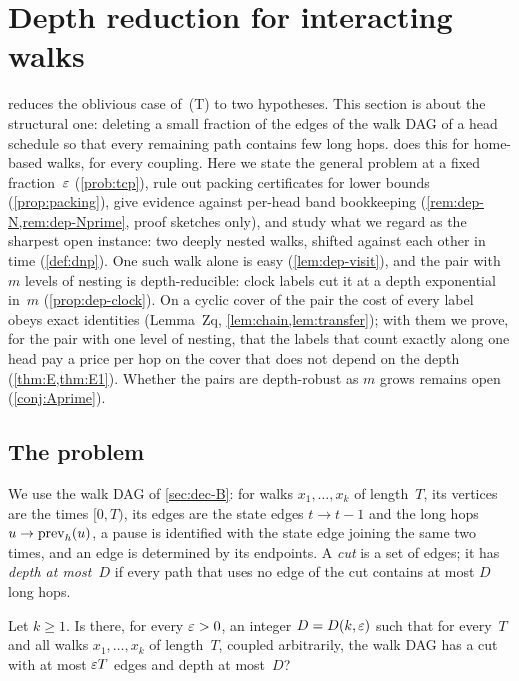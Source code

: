 \section{Depth reduction for interacting walks}\label{sec:depth}

 reduces the oblivious case of~(T) to two hypotheses. This section is about the structural one: deleting a
small fraction of the edges of the walk DAG of a head schedule so that every remaining path contains few long hops.
 does this for home-based walks, for every coupling. Here we state the general problem at a fixed
fraction~$\varepsilon$ (\cref{prob:tcp}), rule out packing certificates for lower bounds (\cref{prop:packing}), give
evidence against per-head band bookkeeping (\cref{rem:dep-N,rem:dep-Nprime}, proof sketches only), and study what we
regard as the sharpest open instance: two deeply nested walks, shifted against each other in time (\cref{def:dnp}). One
such walk alone is easy (\cref{lem:dep-visit}), and the pair with $m$ levels of nesting is depth-reducible: clock labels cut
it at a depth exponential in~$m$ (\cref{prop:dep-clock}). On a cyclic cover of the pair the cost of every label obeys exact
identities (Lemma~Zq, \cref{lem:chain,lem:transfer}); with them we prove, for the pair with one level of nesting, that
the labels that count exactly along one head pay a price per hop on the cover that does not depend on the depth
(\cref{thm:E,thm:E1}). Whether the pairs are depth-robust as $m$ grows remains open (\cref{conj:Aprime}).

\subsection{The problem}\label{sec:dep-problem}

We use the walk DAG of \cref{sec:dec-B}: for walks $x_1,\dots,x_k$ of length~$T$, its vertices are the times
$[0,T)$, its edges are the state edges $t\to t-1$ and the long hops $u\to\mathrm{prev}_h(u)$, a pause is identified with the
state edge joining the same two times, and an edge is determined by its endpoints. A \emph{cut} is a set of edges; it
has \emph{depth at most~$D$} if every path that uses no edge of the cut contains at most $D$ long hops.

\begin{problem}\label{prob:tcp}
Let $k\ge1$. Is there, for every $\varepsilon>0$, an integer $D=D(k,\varepsilon)$ such that for every~$T$ and all walks
$x_1,\dots,x_k$ of length~$T$, coupled arbitrarily, the walk DAG has a cut with at most $\varepsilon T$ edges and depth at
most~$D$?
\end{problem}

